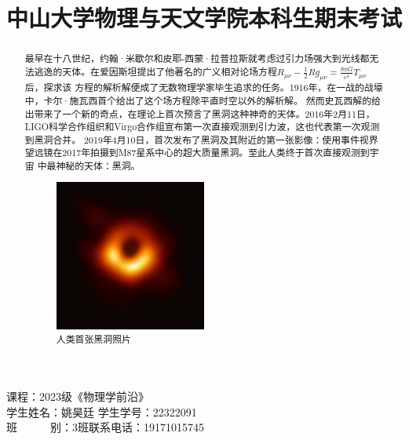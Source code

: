 \documentclass{article}
\begin{document}
\begin{titlepage}
    \title{\vspace{-4cm}\textbf{\cusong 中山大学物理与天文学院本科生期末考试}}
    \date{}
    \author{}
\end{titlepage}
\maketitle
\noindent 课程：2023级《物理学前沿》\\
\noindent 学生姓名：姚昊廷 \hfill 学生学号：22322091\\
\noindent 班\ \ \ \ \ \ 别：3班\hfill 联系电话：19171015745\\
\begin{abstract}
    最早在十八世纪，约翰·米歇尔和皮耶-西蒙·拉普拉斯就考虑过引力场强大到光线都无法逃逸的天体。在爱因斯坦提出了他著名的广义相对论场方程$R_{\mu\nu}-\frac{1}{2}Rg_{\mu\nu}=\frac{8\pi G}{c^4}T_{\mu\nu}$后，探求该
    方程的解析解便成了无数物理学家毕生追求的任务。1916年，在一战的战壕中，卡尔·施瓦西首个给出了这个场方程除平直时空以外的解析解。
    然而史瓦西解的给出带来了一个新的奇点，在理论上首次预言了黑洞这种神奇的天体。2016年2月11日，LIGO科学合作组织和Virgo合作组宣布第一次直接观测到引力波，这也代表第一次观测到黑洞合并。
    2019年4月10日，首次发布了黑洞及其附近的第一张影像：使用事件视界望远镜在2017年拍摄到M87星系中心的超大质量黑洞。至此人类终于首次直接观测到宇宙
    中最神秘的天体：黑洞。
    \begin{figure}[H]
        \centering
        \includegraphics[width=0.5\textwidth]{Black_hole_-_Messier_87_crop_max_res.jpg}
        \caption{人类首张黑洞照片}
    \end{figure}
\end{abstract}
\end{document}
